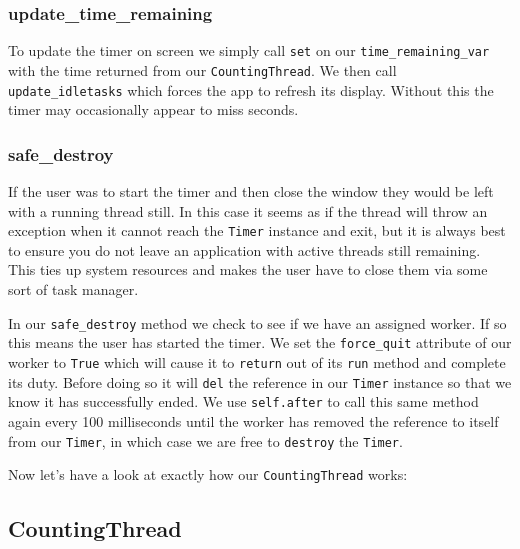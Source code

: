 \documentclass[a4paper,11pt,openany]{book}
\begin{document}
\subsubsection{update\_time\_remaining}
To update the timer on screen we simply call \lstinline[columns=fixed]{set} on our \lstinline[columns=fixed]{time_remaining_var} with the time returned from our \lstinline[columns=fixed]{CountingThread}. We then call \lstinline[columns=fixed]{update_idletasks} which forces the app to refresh its display. Without this the timer may occasionally appear to miss seconds. 

\subsubsection{safe\_destroy}
If the user was to start the timer and then close the window they would be left with a running thread still. In this case it seems as if the thread will throw an exception when it cannot reach the \lstinline[columns=fixed]{Timer} instance and exit, but it is always best to ensure you do not leave an application with active threads still remaining. This ties up system resources and makes the user have to close them via some sort of task manager. 

\vspace{5mm}

In our \lstinline[columns=fixed]{safe_destroy} method we check to see if we have an assigned worker. If so this means the user has started the timer. We set the \lstinline[columns=fixed]{force_quit} attribute of our worker to \lstinline[columns=fixed]{True} which will cause it to \lstinline[columns=fixed]{return} out of its \lstinline[columns=fixed]{run} method and complete its duty. Before doing so it will \lstinline[columns=fixed]{del} the reference in our \lstinline[columns=fixed]{Timer} instance so that we know it has successfully ended. We use \lstinline[columns=fixed]{self.after} to call this same method again every 100 milliseconds until the worker has removed the reference to itself from our \lstinline[columns=fixed]{Timer}, in which case we are free to \lstinline[columns=fixed]{destroy} the \lstinline[columns=fixed]{Timer}. 

\vspace{5mm}

Now let's have a look at exactly how our \lstinline[columns=fixed]{CountingThread} works:

\subsection{CountingThread}
\end{document}
